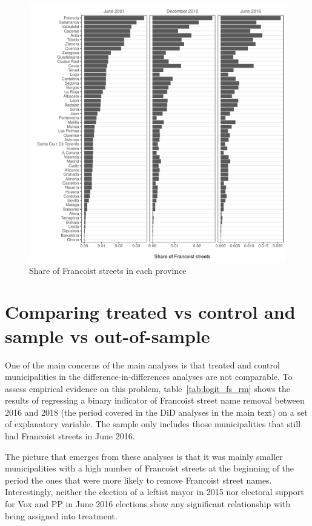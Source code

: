 \documentclass[12pt, titlepage]{article}
\begin{document}
\begin{figure}[htb!]
\centering

  \includegraphics[width = \textwidth]{img/fs_by_prov}

  \caption{Share of Francoist streets in each province}\label{fig:fs_by_prov}

\end{figure}

\clearpage
\section{Comparing treated vs control and sample vs out-of-sample}

One of the main concerns of the main analyses is that treated and control municipalities in the difference-in-differences analyses are not comparable.
To assess empirical evidence on this problem, table~\ref{tab:logit_fs_rm} shows the results of regressing a binary indicator of Francoist street name removal between 2016 and 2018 (the period covered in the DiD analyses in the main text) on a set of explanatory variable.
The sample only includes those municipalities that still had Francoist streets in June 2016.



The picture that emerges from these analyses is that it was mainly smaller municipalities with a high number of Francoist streets at the beginning of the period the ones that were more likely to remove Francoist street names.
Interestingly, neither the election of a leftist mayor in 2015 nor electoral support for Vox and PP in June 2016 elections show any significant relationship with being assigned into treatment.
\end{document}
